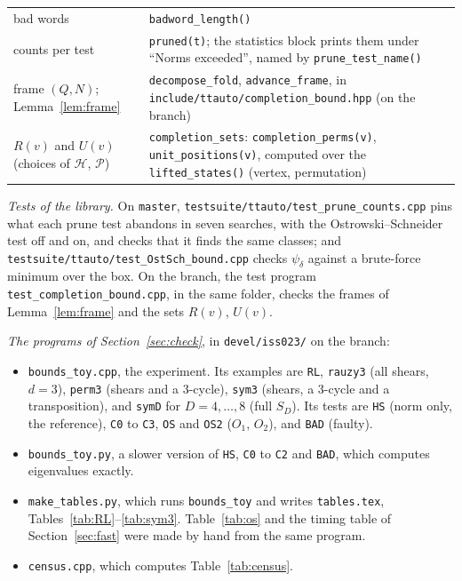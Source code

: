 \documentclass[11pt]{amsart}
\newcommand{\code}[1]{\texttt{#1}}
\newcommand{\Pos}{\mathcal{P}}
\newcommand{\Hgp}{\mathcal{H}}
\theoremstyle{plain}
\theoremstyle{definition}
\begin{document}
\begin{center}
\begin{tabular}{>{\raggedright\arraybackslash}p{}
                  >{\raggedright\arraybackslash}p{}}
    bad words & \code{badword\_length()} \\
    counts per test & \code{pruned(t)}; the statistics block prints them
      under ``Norms exceeded'', named by \code{prune\_test\_name()} \\
    frame $(Q,N)$; Lemma~\ref{lem:frame} &
      \code{decompose\_fold}, \code{advance\_frame}, in
      \code{include/ttauto/completion\_bound.hpp} (on the branch) \\
    $R(v)$ and $U(v)$ (choices of $\Hgp$, $\Pos$) &
      \code{completion\_sets}: \code{completion\_perms(v)},
      \code{unit\_positions(v)}, computed over the \code{lifted\_states()}
      (vertex, permutation) \\
    \bottomrule
  \end{tabular}
\end{center}

\emph{Tests of the library.}  On \code{master},
\code{testsuite/ttauto/test\_prune\_counts.cpp} pins what each prune test
abandons in seven searches, with the Ostrowski--Schneider test off and on,
and checks that it finds the same classes; and
\code{testsuite/ttauto/test\_OstSch\_bound.cpp} checks $\psi_\delta$ against
a brute-force minimum over the box.  On the branch, the test program
\code{test\_completion\_bound.cpp}, in the same folder, checks the frames
of Lemma~\ref{lem:frame} and the sets $R(v)$, $U(v)$.

\emph{The programs of Section~\ref{sec:check}}, in \code{devel/iss023/} on the
branch:
\begin{itemize}
\item \code{bounds\_toy.cpp}, the experiment.  Its examples are
  \code{RL}, \code{rauzy3} (all shears, $d=3$), \code{perm3} (shears and a
  3-cycle), \code{sym3} (shears, a 3-cycle and a transposition), and
  \code{symD} for $D=4,\dots,8$ (full $S_D$).  Its
  tests are \code{HS} (norm only, the reference), \code{C0} to \code{C3},
  \code{OS} and \code{OS2} ($O_1$, $O_2$), and \code{BAD} (faulty).
\item \code{bounds\_toy.py}, a slower version of \code{HS}, \code{C0} to
  \code{C2} and \code{BAD}, which computes eigenvalues exactly.
\item \code{make\_tables.py}, which runs \code{bounds\_toy} and writes
  \code{tables.tex}, Tables~\ref{tab:RL}--\ref{tab:sym3}.
  Table~\ref{tab:os} and the timing table of Section~\ref{sec:fast} were
  made by hand from the same program.
\item \code{census.cpp}, which computes Table~\ref{tab:census}.
\end{itemize}
\end{document}
